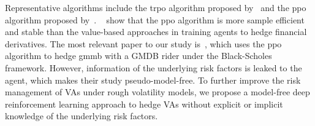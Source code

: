 Representative algorithms include the \gls{trpo} algorithm proposed by~\cite{schulman2015trust} and the \gls{ppo} algorithm proposed by~\cite{schulman2017proximal}.
~\cite{du2020deep} show that the \gls{ppo} algorithm is more sample efficient and stable than the value-based approaches in training agents to hedge financial derivatives.
The most relevant paper to our study is~\cite{chong2023pseudo}, which uses the \gls{ppo} algorithm to hedge \gls{gmmb} with a GMDB rider under the Black-Scholes framework.
However, information of the underlying risk factors is leaked to the agent, which makes their study pseudo-model-free.
To further improve the risk management of VAs under rough volatility models, we propose a model-free deep reinforcement learning approach to hedge VAs without explicit or implicit knowledge of the underlying risk factors.

